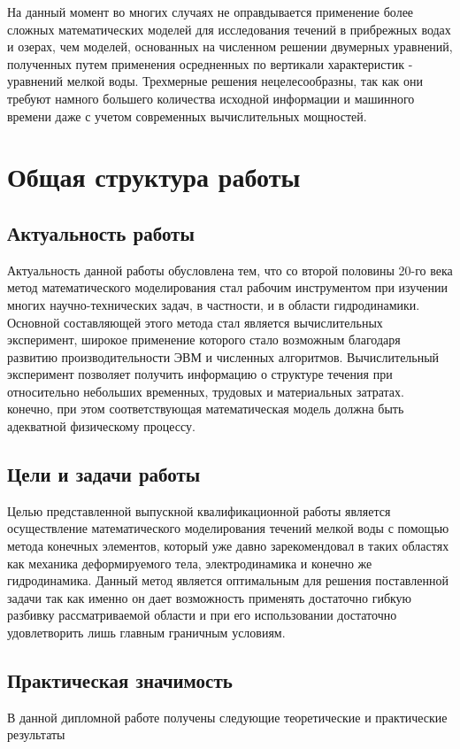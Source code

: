 \documentclass[14pt]{extreport}
\begin{document}


\tableofcontents
\intro

На данный момент во многих случаях не оправдывается применение более сложных математических моделей для исследования течений в прибрежных водах и озерах, чем моделей, основанных на численном решении двумерных уравнений, полученных путем применения осредненных по вертикали характеристик - уравнений мелкой воды. Трехмерные решения нецелесообразны, так как они требуют намного большего количества исходной информации и машинного времени даже с учетом современных вычислительных мощностей.


\chapter{Общая структура работы}
\section{Актуальность работы}
Актуальность данной работы обусловлена тем, что со второй половины 20-го века метод математического моделирования стал рабочим инструментом при изучении многих научно-технических задач, в частности, и в области гидродинамики. Основной составляющей этого метода стал является вычислительных эксперимент, широкое применение которого стало возможным благодаря развитию производительности ЭВМ и численных алгоритмов. Вычислительный эксперимент позволяет получить информацию о структуре течения при относительно небольших временных, трудовых и материальных затратах. конечно, при этом соответствующая математическая модель должна быть адекватной физическому процессу.


\section{Цели и задачи работы}
Целью представленной выпускной квалификационной работы является осуществление математического моделирования течений мелкой воды с помощью метода конечных элементов, который уже давно зарекомендовал в таких областях как механика деформируемого тела, электродинамика и конечно же гидродинамика. Данный метод является оптимальным для решения поставленной задачи так как именно он дает возможность применять достаточно гибкую разбивку рассматриваемой области и при его использовании достаточно удовлетворить лишь главным граничным условиям.

\section{Практическая значимость}
В данной дипломной работе получены следующие теоретические и практические результаты
\end{document}
